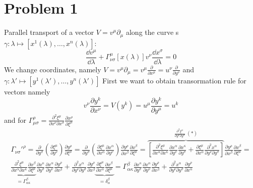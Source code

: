 
\section*{Problem 1}

Parallel transport of a vector $V=v^\mu\partial_\mu$ along the curve s
$\gamma:\lambda\mapsto\left[x^1(\lambda),\dots,x^n(\lambda)\right]$:
%
\begin{equation}
    \frac{\dd v^\mu}{\dd\lambda} +
    \Gamma_{\nu\sigma}^{\mu}\left[x(\lambda)\right]v^\nu\frac{\dd x^\sigma}{\dd \lambda}=0
\end{equation}
%
We change coordinates, namely $V = v^\mu\partial_\mu
    = v^\mu\frac{\partial}{\partial x^\mu}=u^\nu\frac{\partial}{\partial y^\nu}$ and
$\gamma:\lambda'\mapsto\left[y^1(\lambda'),\dots,y^n(\lambda')\right]$
%
First we want to obtain transormation rule for vectors namely
%
\begin{equation}
    v^\nu\frac{\partial y^k}{\partial x^\nu}
    = V(y^k) =
    u^\mu\frac{\partial y^k}{\partial y^\mu} = u^k
\end{equation}
%
and for $\Gamma_{\mu\sigma}^\rho=\frac{\partial^2 \xi^\mu}{\partial x^\nu \partial x^\sigma}
    \frac{\partial x^\rho}{\partial\xi^\mu}$
%
\begin{multline}
    \Gamma_{\nu\sigma}'^\rho =
    \frac{\partial}{\partial y^\sigma}
    \left(\frac{\partial \xi^\mu}{\partial y^\nu}\right)
    \frac{\partial y^\rho}{\partial\xi^\mu}=
    \frac{\partial}{\partial y^\sigma}
    \left(\frac{\partial \xi^\mu}{\partial x^\alpha}\frac{\partial x^\alpha}{\partial y^\nu}\right)
    \frac{\partial y^\rho}{\partial x^\beta}\frac{\partial x^\beta}{\partial\xi^\mu}=
    \overbrace{\left[\frac{\partial^2 \xi^\mu}{\partial x^\alpha \partial x^\kappa}
            \frac{\partial x^\alpha}{\partial y^\nu}
            \frac{\partial x^\kappa}{\partial y^\sigma} +
            \frac{\partial \xi^\mu}{\partial x^\alpha}
            \frac{\partial^2 x^\alpha}{\partial y^\nu \partial y^\sigma}\right]}^{
        \frac{\partial^2 \xi^\mu}{\partial y^\nu \partial y^\sigma}~(*)}
    \frac{\partial y^\rho}{\partial x^\beta}\frac{\partial x^\beta}{\partial\xi^\mu}= \\
    \underbrace{\frac{\partial^2 \xi^\mu}{\partial x^\alpha \partial x^\kappa}
        \frac{\partial x^\beta}{\partial\xi^\mu} }_{=\Gamma_{\alpha\kappa}^\beta}
    \frac{\partial x^\kappa}{\partial y^\sigma}
    \frac{\partial x^\alpha}{\partial y^\nu}
    \frac{\partial y^\rho}{\partial x^\beta}
    +
    \frac{\partial^2 x^\alpha}{\partial y^\nu \partial y^\sigma}
    \frac{\partial y^\rho}{\partial x^\beta}
    \underbrace{\frac{\partial \xi^\mu}{\partial x^\alpha}
        \frac{\partial x^\beta}{\partial\xi^\mu}}_{=\delta_\alpha^\beta}=
    \Gamma_{\alpha\kappa}^\beta
    \frac{\partial x^\kappa}{\partial y^\sigma}
    \frac{\partial x^\alpha}{\partial y^\nu}
    \frac{\partial y^\rho}{\partial x^\beta}
    +
    \frac{\partial^2 x^\alpha}{\partial y^\nu \partial y^\sigma}
    \frac{\partial y^\rho}{\partial x^\alpha}
\end{multline}

